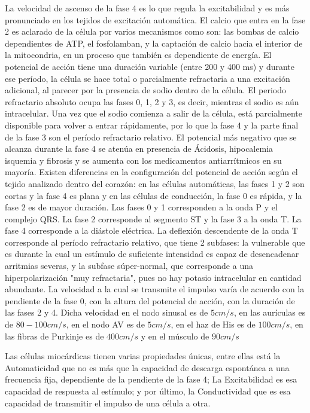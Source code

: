 \documentclass[spanish,11pt,letterpaper,oneside]{memoir}
\begin{document}
	La velocidad de ascenso de la fase 4 es lo que regula la excitabilidad y es más pronunciado en los tejidos de excitación automática. El calcio que entra en la fase 2 es aclarado de la célula por varios mecanismos como son: las bombas de calcio dependientes de ATP, el fosfolamban, y la captación de calcio hacia el interior de la mitocondria, en un proceso que también es dependiente de energía. El potencial de acción tiene una duración variable (entre 200 y 400 ms) y durante ese período, la célula se hace total o parcialmente refractaria a una excitación adicional, al parecer por la presencia de sodio dentro de la célula. El periodo refractario absoluto ocupa las fases 0, 1, 2 y 3, es decir, mientras el sodio es aún intracelular. Una vez que el sodio comienza a salir de la célula, está parcialmente disponible para volver a entrar rápidamente, por lo que la fase 4 y la parte final de la fase 3 son el período refractario relativo. El potencial más negativo que se alcanza durante la fase 4 se atenúa en presencia de Ácidosis, hipocalemia isquemia y fibrosis y se aumenta con los medicamentos antiarrítmicos en su mayoría. Existen diferencias en la configuración del potencial de acción según el tejido analizado dentro del corazón: en las células automáticas, las fases 1 y 2 son cortas y la fase 4 es plana y en las células de conducción, la fase 0 es rápida, y la fase 2 es de mayor duración. Las fases 0 y 1 corresponden a la onda P y el complejo QRS. La fase 2 corresponde al segmento ST y la fase 3 a la onda T. La fase 4 corresponde a la diástole eléctrica. La deflexión descendente de la onda T corresponde al período refractario relativo, que tiene 2 subfases: la vulnerable que es durante la cual un estímulo de suficiente intensidad es capaz de desencadenar arritmias severas, y la subfase súper-normal, que corresponde a una hiperpolarización "muy refractaria", pues no hay potasio intracelular en cantidad abundante. La velocidad a la cual se transmite el impulso varía de acuerdo con la pendiente de la fase 0, con la altura del potencial de acción, con la duración de las fases 2 y 4. Dicha velocidad en el nodo sinusal es de $5 cm/s$, en las aurículas es de $80-100 cm/s$, en el nodo AV es de $5 cm/s$, en el haz de His es de $100 cm/s$, en las fibras de Purkinje es de $400 cm/s$ y en el músculo de $90 cm/s$
	
	Las células miocárdicas tienen varias propiedades únicas, entre ellas está la Automaticidad que no es más que la capacidad de descarga espontánea a una frecuencia fija, dependiente de la pendiente de la fase 4; La Excitabilidad es esa capacidad de respuesta al estímulo; y por último, la Conductividad que es esa capacidad de transmitir el impulso de una célula a otra.
	
\end{document}
